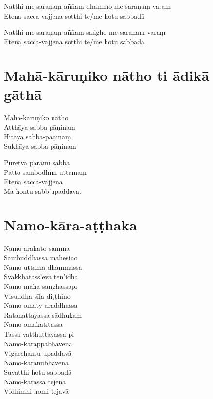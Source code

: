 Natthi me saraṇaṃ aññaṃ dhammo me saraṇaṃ varaṃ\\
Etena sacca-vajjena sotthi te/me hotu sabbadā

Natthi me saraṇaṃ aññaṃ saṅgho me saraṇaṃ varaṃ\\
Etena sacca-vajjena sotthi te/me hotu sabbadā

\section{Mahā-kāruṇiko nātho ti ādikā gāthā}


\begin{paritta}
Mahā-kāruṇiko nātho\\
Atthāya sabba-pāṇinaṃ\\
Hitāya sabba-pāṇinaṃ\\
Sukhāya sabba-pāṇinaṃ

Pūretvā pāramī sabbā\\
Patto sambodhim-uttamaṃ\\
Etena sacca-vajjena\\
Mā hontu sabb'upaddavā.
\end{paritta}


\vspace*{-0.6\baselineskip}

\enlargethispage{3\baselineskip}

\section{Namo-kāra-aṭṭhaka}


\begin{paritta}
Namo arahato sammā\\
Sambuddhassa mahesino\\
Namo uttama-dhammassa\\
Svākkhātass'eva ten'idha\\
Namo mahā-saṅghassāpi\\
Visuddha-sīla-diṭṭhino\\
Namo omāty-āraddhassa\\
Ratanattayassa sādhukaṃ\\
Namo omakātītassa\\
Tassa vatthuttayassa-pi\\
Namo-kārappabhāvena\\
Vigacchantu upaddavā\\
Namo-kārānubhāvena\\
Suvatthi hotu sabbadā\\
Namo-kārassa tejena\\
Vidhimhi homi tejavā 
\end{paritta}

